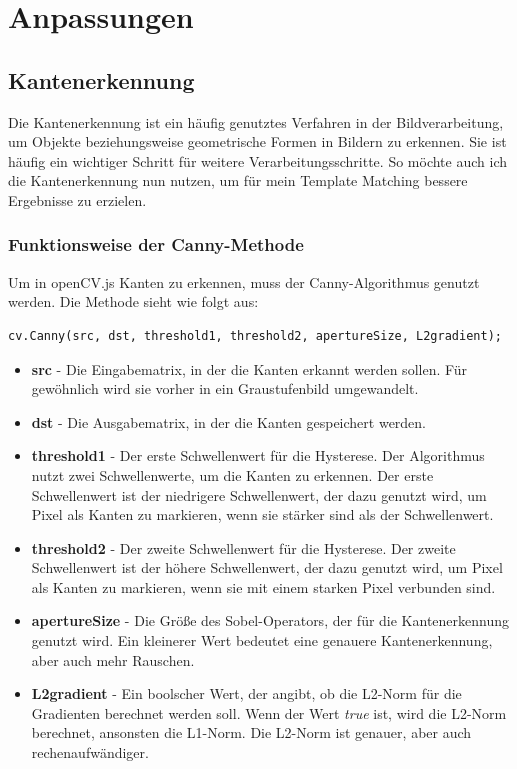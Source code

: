 \section{Anpassungen}

\subsection{Kantenerkennung}
Die Kantenerkennung ist ein häufig genutztes Verfahren in der Bildverarbeitung, um Objekte beziehungsweise geometrische Formen in Bildern zu erkennen. Sie ist häufig ein wichtiger Schritt für weitere Verarbeitungsschritte. So möchte auch ich die Kantenerkennung nun nutzen, um für mein Template Matching bessere Ergebnisse zu erzielen.

\subsubsection{Funktionsweise der Canny-Methode}
Um in openCV.js Kanten zu erkennen, muss der Canny-Algorithmus genutzt werden. Die Methode sieht wie folgt aus:
\begin{lstlisting}[style=JavaScript]
cv.Canny(src, dst, threshold1, threshold2, apertureSize, L2gradient);
\end{lstlisting}

\begin{itemize}
    \item \textbf{src} - Die Eingabematrix, in der die Kanten erkannt werden sollen. Für gewöhnlich wird sie vorher in ein Graustufenbild umgewandelt.
    \item \textbf{dst} - Die Ausgabematrix, in der die Kanten gespeichert werden.
    \item \textbf{threshold1} - Der erste Schwellenwert für die Hysterese. Der Algorithmus nutzt zwei Schwellenwerte, um die Kanten zu erkennen. Der erste Schwellenwert ist der niedrigere Schwellenwert, der dazu genutzt wird, um Pixel als Kanten zu markieren, wenn sie stärker sind als der Schwellenwert.
    \item \textbf{threshold2} - Der zweite Schwellenwert für die Hysterese. Der zweite Schwellenwert ist der höhere Schwellenwert, der dazu genutzt wird, um Pixel als Kanten zu markieren, wenn sie mit einem starken Pixel verbunden sind.
    \item \textbf{apertureSize} - Die Größe des Sobel-Operators, der für die Kantenerkennung genutzt wird. Ein kleinerer Wert bedeutet eine genauere Kantenerkennung, aber auch mehr Rauschen.
    \item \textbf{L2gradient} - Ein boolscher Wert, der angibt, ob die L2-Norm für die Gradienten berechnet werden soll. Wenn der Wert \textit{true} ist, wird die L2-Norm berechnet, ansonsten die L1-Norm. Die L2-Norm ist genauer, aber auch rechenaufwändiger.
\end{itemize}

